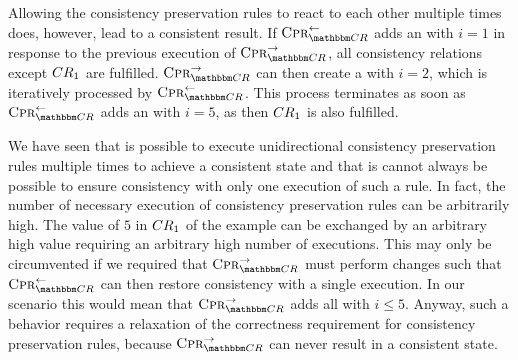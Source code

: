 Allowing the consistency preservation rules to react to each other multiple times does, however, lead to a consistent result.
If $\consistencypreservationrule{\consistencyrelationset{CR}}^{\leftarrow}$ adds an  with $i = 1$ in response to the previous execution of $\consistencypreservationrule{\consistencyrelationset{CR}}^{\rightarrow}$, all consistency relations except $CR_{1}$ are fulfilled.
$\consistencypreservationrule{\consistencyrelationset{CR}}^{\rightarrow}$ can then create a  with $i = 2$, which is iteratively processed by $\consistencypreservationrule{\consistencyrelationset{CR}}^{\leftarrow}$.
This process terminates as soon as $\consistencypreservationrule{\consistencyrelationset{CR}}^{\leftarrow}$ adds an  with $i = 5$, as then $CR_{1}$ is also fulfilled.

We have seen that is possible to execute unidirectional consistency preservation rules multiple times to achieve a consistent state and that is cannot always be possible to ensure consistency with only one execution of such a rule.
In fact, the number of necessary execution of consistency preservation rules can be arbitrarily high.
The value of $5$ in $CR_{1}$ of the example can be exchanged by an arbitrary high value requiring an arbitrary high number of executions.
This may only be circumvented if we required that $\consistencypreservationrule{\consistencyrelationset{CR}}^{\rightarrow}$ must perform changes such that $\consistencypreservationrule{\consistencyrelationset{CR}}^{\leftarrow}$ can then restore consistency with a single execution.
In our scenario this would mean that $\consistencypreservationrule{\consistencyrelationset{CR}}^{\rightarrow}$ adds all  with $i \leq 5$.
Anyway, such a behavior requires a relaxation of the correctness requirement for consistency preservation rules, because $\consistencypreservationrule{\consistencyrelationset{CR}}^{\rightarrow}$ can never result in a consistent state.

